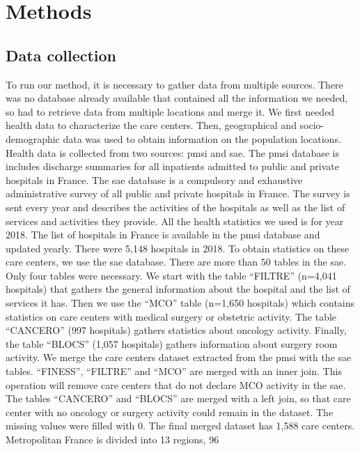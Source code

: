 \section{Methods}

\subsection{Data collection}

To run our method, it is necessary to gather data from multiple sources. There
was no database already available that contained all the information we needed,
so had to retrieve data from multiple locations and merge it. We first needed
health data to characterize the care centers. Then, geographical and
socio-demographic data was used to obtain information on the population
locations. Health data is collected from two sources: \ac{pmsi} and \ac{sae}.
The \ac{pmsi} database is includes discharge summaries for all inpatients
admitted to public and private hospitals in France. The \ac{sae} database is a
compulsory and exhaustive administrative survey of all public and private
hospitals in France. The survey is sent every year and describes the activities
of the hospitals as well as the list of services and activities they provide.
All the health statistics we used is for year 2018. The list of hospitals in
France is available in the \ac{pmsi} database and updated yearly. There were
5,148 hospitals in 2018. To obtain statistics on these care centers, we use the
\ac{sae} database. There are more than 50 tables in the \ac{sae}. Only four
tables were necessary. We start with the table ``FILTRE'' (n=4,041 hospitals)
that gathers the general information about the hospital and the list of services
it has. Then we use the ``MCO'' table (n=1,650 hospitals) which contains
statistics on care centers with medical surgery or obstetric activity. The table
``CANCERO'' (997 hospitals) gathers statistics about oncology activity. Finally,
the table ``BLOCS'' (1,057 hospitals) gathers information about surgery room
activity. We merge the care centers dataset extracted from the \ac{pmsi} with
the \ac{sae} tables. ``FINESS'', ``FILTRE'' and ``MCO'' are merged with an inner
join. This operation will remove care centers that do not declare MCO activity
in the \ac{sae}. The tables ``CANCERO'' and ``BLOCS'' are merged with a left
join, so that care center with no oncology or surgery activity could remain in
the dataset. The missing values were filled with 0. The final merged dataset has
1,588 care centers. Metropolitan France is divided into 13 regions, 96
